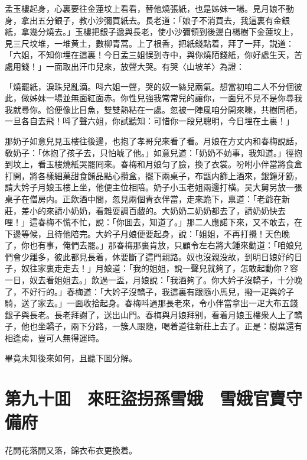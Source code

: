 孟玉樓起身，心裏要往金蓮坟上看看，替他燒張紙，也是姊妹一場。見月娘不動身，拿出五分銀子，教小沙彌買紙去。長老道：「娘子不消買去，我這裏有金銀紙，拿幾分燒去。」玉樓把銀子遞與長老，使小沙彌領到後邊白楊樹下金蓮坟上，見三尺坟堆，一堆黄土，數柳青蒿。上了根香，把紙錢點着，拜了一拜，説道：「六姐，不知你埋在這裏！今日孟三姐悮到寺中，與你燒陌錢紙，你好處生天，苦處用錢！」一面取出汗巾兒來，放聲大哭。有哭〈山坡羊〉為證：

「燒罷紙，淚珠兒亂滴。呌六姐一聲，哭的奴一絲兒兩氣。想當初咱二人不分個彼此，做姊妹一場並無面紅面赤。你性兒強我常常兒的讓你，一面兒不見不是你尋我我就尋你。恰便像比目魚，雙雙熱粘在一處。忽被一陣風咱分開來嚛，共樹同栖，一旦各自去飛！呌了聲六姐，你試聽知：可惜你一段兒聰明，今日埋在土裏！」

那奶子如意兒見玉樓往後邊，也抱了孝哥兒來看了看。月娘在方丈内和春梅說話，敎奶子：「休抱了孩子去，只怕唬了他。」如意兒道：「奶奶不妨事，我知道。」徑抱到坟上，看玉樓燒紙哭罷囘來。春梅和月娘匀了臉，換了衣裳。吩咐小伴當將食盒打開，將各樣細菓甜食餚品點心攢盒，擺下兩桌子，布甑内篩上酒來，銀鐘牙筯，請大妗子月娘玉樓上坐，他便主位相陪。奶子小玉老姐兩邊打横。吴大舅另放一張桌子在僧房内。正飲酒中間，忽見兩個青衣伴當，走來跪下，禀道：「老爺在新莊，差小的來請小奶奶，看雜耍調百戯的。大奶奶二奶奶都去了，請奶奶快去哩！」這春梅不慌不忙，說：「你囬去，知道了。」那二人應諾下來，又不敢去，在下邊等候，且待他陪完。大妗子月娘便要起身，說：「姐姐，不再打攪！天色晚了，你也有事，俺們去罷。」那春梅那裏肯放，只顧令左右將大鍾來勸道：「咱娘兒們會少離多，彼此都見長着，休要斷了這門親路。奴也沒親没故，到明日娘好的日子，奴往家裏走走去！」月娘道：「我的姐姐，說一聲兒就夠了，怎敢起動你？容一日，奴去看姐姐去。」飲過一盃，月娘說：「我酒夠了。你大妗子沒轎子，十分晚了，不好行的。」春梅道：「大妗子沒轎子，我這裏有跟隨小馬兒，撥一疋與妗子騎，送了家去。」一面收拾起身。春梅呌過那長老來，令小伴當拿出一疋大布五錢銀子與長老。長老拜謝了，送出山門。春梅與月娘拜别，看着月娘玉樓衆人上了轎子，他也坐轎子，兩下分路，一簇人跟隨，喝着道往新莊上去了。正是：樹葉還有相逢䖏，豈可人無得運時。

畢竟未知後來如何，且聽下囬分解。

\chapter*{第九十囬　來旺盜拐孫雪娥　雪娥官賣守備府}

花開花落開又落，錦衣布衣更換着。

